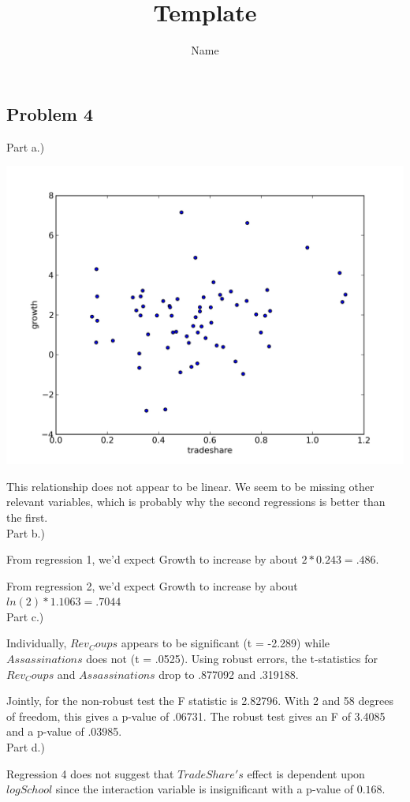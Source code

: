 \documentclass[11pt]{article}
\title{Template}
\author{Name}
\begin{document}
\subsection*{Problem 4}
Part a.)

    \includegraphics[scale = .33]{tradeGrowthScatter.png}

This relationship does not appear to be linear.  We seem to be missing other relevant variables, which is probably why the second regressions is better than the first.
\\

Part b.)

From regression 1, we'd expect Growth to increase by about $2 * 0.243 = .486$. 

From regression 2, we'd expect Growth to increase by about $ln(2) * 1.1063 = .7044$
\\

Part c.)

Individually, $Rev_Coups$ appears to be significant (t = -2.289) while $Assassinations$ does not (t = .0525).  Using robust errors, the t-statistics for $Rev_Coups$ and $Assassinations$ drop to .877092 and .319188.

Jointly, for the non-robust test the F statistic is 2.82796.  With 2 and 58 degrees of freedom, this gives a p-value of .06731.  The robust test gives an F of 3.4085 and a p-value of .03985.
\\

Part d.)

Regression 4 does not suggest that $TradeShare's$ effect is dependent upon $logSchool$ since the interaction variable is insignificant with a p-value of $0.168$.
\\
\end{document}

